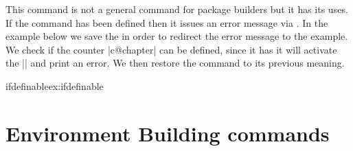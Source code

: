 \begin{macro}{\@ifdefinable}
\begin{macro}{\@@ifdefinable}
\begin{macro}{\@rc@ifdefinable}

\begin{teX}
\long\def\@ifdefinable #1#2{%
      \edef\reserved@a{\expandafter\@gobble\string #1}%
     \@ifundefined\reserved@a
         {\edef\reserved@b{\expandafter\@carcube \reserved@a xxx\@nil}%
          \ifx \reserved@b\@qend \@notdefinable\else
            \ifx \reserved@a\@qrelax \@notdefinable\else
              #2%
            \fi
          \fi}%
         \@notdefinable}
\end{teX}

\begin{teX}
\let\@@ifdefinable\@ifdefinable
\end{teX}


\begin{teX}
\long{}
\end{teX}
\end{macro}
\end{macro}
\end{macro}

This command is not a general command for package builders but it has its uses. If the command
has been defined then it issues an error message via \CMDI{\@notdefinable}. In the example
below we save the \cmd{\@notdefinable} in order to redirect the error message to the example.
We check if the counter |c@chapter| can be defined, since it has it will activate the |\@notdefinable| and
print an error. We then restore the command to its previous meaning.

\begin{texexample}{ifdefinable}{ex:ifdefinable}
\makeatletter
\let\save@notdefinable\@notdefinable
\def\@notdefinable{Not definable}
\let\@notdefinable\save@notdefinable
\makeatother
\end{texexample}

\section{Environment Building commands}

